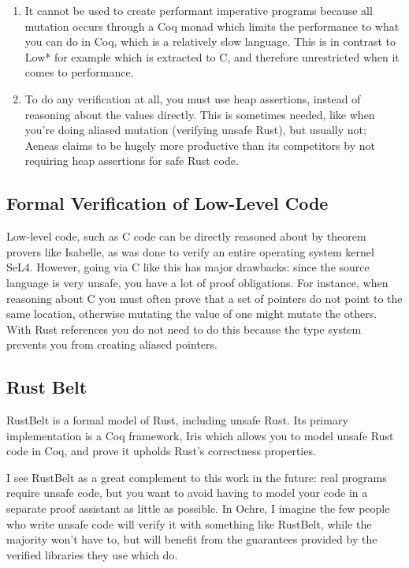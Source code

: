 \documentclass[12pt,twoside]{report}
\begin{document}
\begin{enumerate}
  \item It cannot be used to create performant imperative programs because all mutation occurs through a Coq monad which limits the performance to what you can do in Coq, which is a relatively slow language. This is in contrast to Low*\citep{protzenko_low_2017} for example which is extracted to C, and therefore unrestricted when it comes to performance.
  \item To do any verification at all, you must use heap assertions, instead of reasoning about the values directly. This is sometimes needed, like when you're doing aliased mutation (verifying unsafe Rust), but usually not; Aeneas\citep{aeneas} claims to be hugely more productive than its competitors by not requiring heap assertions for safe Rust code.
\end{enumerate}

\subsection{Formal Verification of Low-Level Code}
Low-level code, such as C code can be directly reasoned about by theorem provers like Isabelle, as was done to verify an entire operating system kernel SeL4\citep{klein_sel4_2009}. However, going via C like this has major drawbacks: since the source language is very unsafe, you have a lot of proof obligations. For instance, when reasoning about C you must often prove that a set of pointers do not point to the same location, otherwise mutating the value of one might mutate the others. With Rust references you do not need to do this because the type system prevents you from creating aliased pointers.

\subsection{Rust Belt}
RustBelt\citep{jung_rustbelt_2018} is a formal model of Rust, including unsafe Rust. Its primary implementation is a Coq framework, Iris\citep{noauthor_iris_nodate} which allows you to model unsafe Rust code in Coq, and prove it upholds Rust's correctness properties.

I see RustBelt as a great complement to this work in the future: real programs require unsafe code, but you want to avoid having to model your code in a separate proof assistant as little as possible. In Ochre, I imagine the few people who write unsafe code will verify it with something like RustBelt, while the majority won't have to, but will benefit from the guarantees provided by the verified libraries they use which do.
\end{document}
